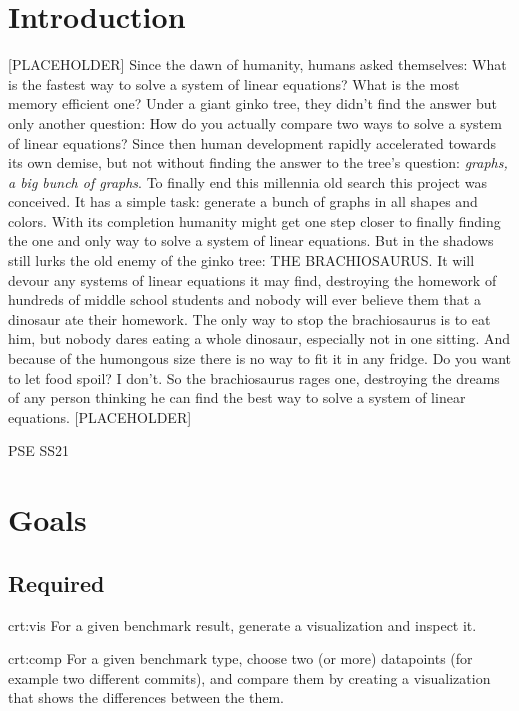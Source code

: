 \section{Introduction}

[PLACEHOLDER] Since the dawn of humanity, humans asked themselves: What is the fastest way to solve a system of linear equations? What is the most memory efficient one? Under a giant ginko tree, they didn't find the answer but only another question: How do you actually compare two ways to solve a system of linear equations? Since then human development rapidly accelerated towards its own demise, but not without finding the answer to the tree's question: \emph{graphs, a big bunch of graphs}. To finally end this millennia old search this project was conceived. It has a simple task: generate a bunch of graphs in all shapes and colors. With its completion humanity might get one step closer to finally finding the one and only way to solve a system of linear equations. But in the shadows still lurks the old enemy of the ginko tree: THE BRACHIOSAURUS. It will devour any systems of linear equations it may find, destroying the homework of hundreds of middle school students and nobody will ever believe them that a dinosaur ate their homework. The only way to stop the brachiosaurus is to eat him, but nobody dares eating a whole dinosaur, especially not in one sitting. And because of the humongous size there is no way to fit it in any fridge. Do you want to let food spoil? I don't. So the brachiosaurus rages one, destroying the dreams of any person thinking he can find the best way to solve a system of linear equations. [PLACEHOLDER]

PSE SS21

\section{Goals}

\subsection{Required}

{crt:vis}
{For a given benchmark result, generate a \gls{visualization} and inspect it.}

{crt:comp}
{For a given benchmark type, choose two (or more) datapoints (for example two different commits), and compare them by creating a visualization that shows the differences between the them.}


